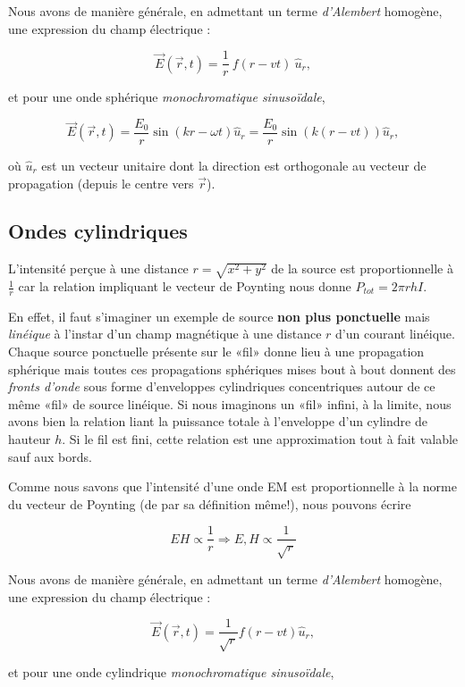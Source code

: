 Nous avons de manière générale, en admettant un terme \textit{d'Alembert} homogène, une expression du champ électrique : 

\[\vec{E}(\vec{r},t) = \frac{1}{r} \:f(r-vt) \:\hat{u}_{r},\] 

et pour une onde sphérique \textit{monochromatique sinusoïdale},

\[\vec{E}(\vec{r},t) = \frac{E_{0}}{r} \sin(kr-\omega t) \hat{u}_{r} = \frac{E_{0}}{r} \sin(k(r- vt)) \hat{u}_{r}, \]

où $\hat{u}_{r}$ est un vecteur unitaire dont la direction est orthogonale au vecteur de propagation (depuis le centre vers $\vec{r}$).


\subsection{Ondes cylindriques} 

L'intensité perçue à une distance $r = \sqrt{x^{2} + y^{2}}$ de la source est proportionnelle à $\frac{1}{r}$ car la relation impliquant le vecteur de Poynting nous 
donne $P_{tot} = 2 \pi r h I$.

En effet, il faut s'imaginer un exemple de source \textbf{non plus ponctuelle} mais \textit{linéique} à l'instar d'un champ magnétique à une 
distance $r$ d'un courant linéique. Chaque source ponctuelle présente sur le «fil» donne lieu à une propagation sphérique mais toutes ces propagations sphériques mises bout à bout donnent 
des \textit{fronts d'onde} sous forme d'enveloppes cylindriques concentriques autour de ce même «fil» de source linéique. Si nous imaginons un «fil» infini, à la limite,
nous avons bien la relation liant la puissance totale à l'enveloppe d'un cylindre de hauteur $h$. Si le fil est fini, cette relation est une approximation tout à fait valable sauf 
aux bords.

Comme nous savons que l'intensité d'une onde EM est proportionnelle à la norme du vecteur de Poynting (de par sa définition même!), nous pouvons écrire 

\[ EH \propto \frac{1}{r} \Rightarrow E,H \propto \frac{1}{\sqrt{r}}\]

Nous avons de manière générale, en admettant un terme \textit{d'Alembert} homogène, une expression du champ électrique : 

\[\vec{E}(\vec{r},t) = \frac{1}{\sqrt{r}} f(r-vt) \hat{u}_{r},\] 

et pour une onde cylindrique \textit{monochromatique sinusoïdale},

